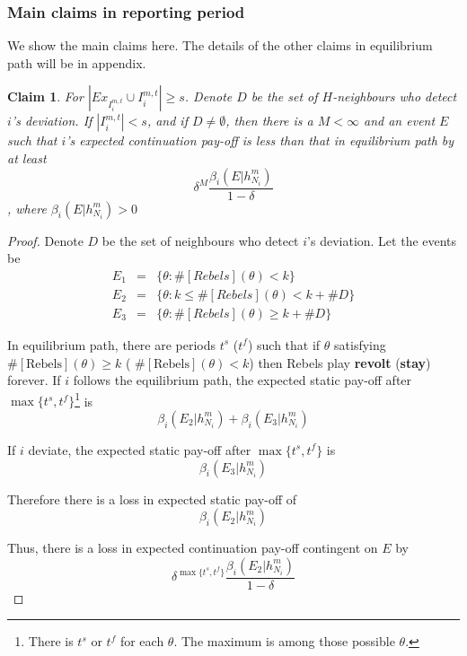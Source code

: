 \documentclass[12pt]{article}
\newtheorem{claim}{Claim}[subsubsection]
\theoremstyle{remark}
\theoremstyle{remark}
\begin{document}
\subsubsection{Main claims in reporting period}

We show the main claims here. The details of the other claims in equilibrium path will be in appendix.


\begin{claim} 
\label{claim_detection_reporting_period}
For $|Ex_{I^{m,t}_i}\cup I^{m,t}_i|\geq s$. Denote $D$ be the set of $H$-neighbours who detect $i$'s deviation. If $|I^{m,t}_i|<s$, and if $D\neq \emptyset$, then there is a $M<\infty$ and an event $E$ such that $i$'s expected continuation pay-off is less than that in equilibrium path by at least 
\[\delta^{M}\frac{\beta_{i}(E|h^{m}_{N_i})}{1-\delta}\]
, where $\beta_{i}(E|h^{m}_{N_i})>0$
\end{claim}
\begin{proof}

Denote $D$ be the set of neighbours who detect $i$'s deviation. Let the events be
\begin{eqnarray*}
E_1 	&= &\{\theta: \#[Rebels](\theta)<k\}\\
E_2 	&= &\{\theta: k\leq \#[Rebels](\theta)<k+\# D\}\\
E_3 	&= &\{\theta: \#[Rebels](\theta)\geq k+\# D\}
\end{eqnarray*}

In equilibrium path, there are periods $t^{s}$ ($t^{f}$) such that if $\theta$ satisfying $\#[\text{Rebels}](\theta)\geq k$ ( $\#[\text{Rebels}](\theta)< k$) then Rebels play \textbf{revolt} (\textbf{stay}) forever. If $i$ follows the equilibrium path, the expected static pay-off after $\max\{t^s,t^f\}$\footnote{There is $t^{s}$ or $t^{f}$ for each $\theta$. The maximum is among those possible $\theta$.} is
 \[\beta_{i}(E_2|h^{m}_{N_i})+\beta_{i}(E_3|h^{m}_{N_i})\]

If $i$ deviate, the expected static pay-off after $\max\{t^s,t^f\}$ is
 \[\beta_{i}(E_3|h^{m}_{N_i})\]
 
Therefore there is a loss in expected static pay-off of
\[\beta_{i}(E_2|h^{m}_{N_i})\]

Thus, there is a loss in expected continuation pay-off contingent on $E$ by
\[\delta^{\max\{t^s,t^f\}}\frac{\beta_{i}(E_2|h^{m}_{N_i})}{1-\delta}\]

\end{proof}
\end{document}
